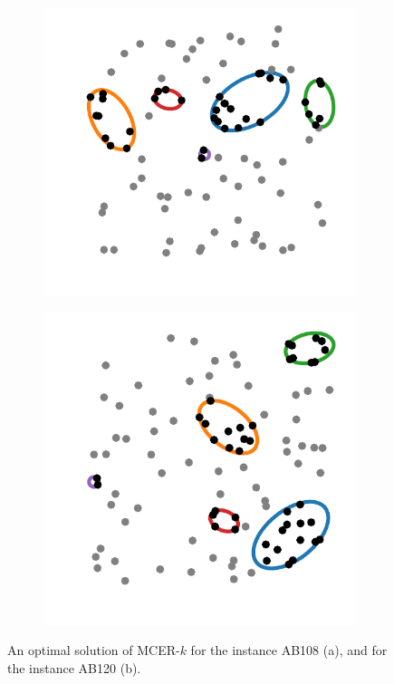 \begin{figure}[!htb]
	
\begin{subfigure}{.5\textwidth}
	\centering
	\includegraphics[scale=.9]{figures/MCER_AB108}
	\caption{}
	\label{fig:AB108}
\end{subfigure}
\begin{subfigure}{.5\textwidth}
	\centering
	\includegraphics[scale=.9]{figures/MCER_AB120}
	\caption{}
	\label{fig:AB120}
\end{subfigure}
	\caption{An optimal solution of MCER-$k$ for the instance AB108 (a), and for the instance AB120 (b).}
	\label{fig:AB108-AB120}
\end{figure}

